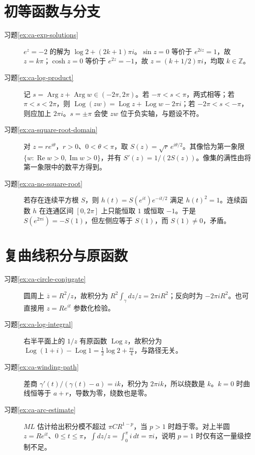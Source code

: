 \documentclass[UTF8,12pt,a4paper,fontset=fandol]{ctexbook}
\begin{document}
\section{初等函数与分支}
\begin{description}
 \item[习题\ref{ex:ca-exp-solutions}]
 $e^z=-2$ 的解为 $\log2+(2k+1)\pi i$。$\sin z=0$ 等价于 $e^{2iz}=1$，故 $z=k\pi$；$\cosh z=0$ 等价于 $e^{2z}=-1$，故 $z=(k+1/2)\pi i$，均取 $k\in\mathbb{Z}$。
 \item[习题\ref{ex:ca-log-product}]
 记 $s=\operatorname{Arg}z+\operatorname{Arg}w\in(-2\pi,2\pi)$。若 $-\pi<s<\pi$，两式相等；若 $\pi<s<2\pi$，则 $\operatorname{Log}(zw)=\operatorname{Log}z+\operatorname{Log}w-2\pi i$；若 $-2\pi<s<-\pi$，则应加上 $2\pi i$。$s=\pm\pi$ 会使 $zw$ 位于负实轴，与题设不符。
 \item[习题\ref{ex:ca-square-root-domain}]
 对 $z=re^{i\theta}$，$r>0$、$0<\theta<\pi$，取 $S(z)=\sqrt r\,e^{i\theta/2}$。其像恰为第一象限 $\{w:\operatorname{Re}w>0,\operatorname{Im}w>0\}$，并有 $S'(z)=1/(2S(z))$。像集的满性由将第一象限中的数平方得到。
 \item[习题\ref{ex:ca-no-square-root}]
 若存在连续平方根 $S$，则 $h(t)=S(e^{it})e^{-it/2}$ 满足 $h(t)^2=1$。连续函数 $h$ 在连通区间 $[0,2\pi]$ 上只能恒取 $1$ 或恒取 $-1$。于是 $S(e^{2\pi i})=-S(1)$，但左侧应等于 $S(1)$，而 $S(1)\ne0$，矛盾。
\end{description}

\section{复曲线积分与原函数}
\begin{description}
 \item[习题\ref{ex:ca-circle-conjugate}]
 圆周上 $\overline z=R^2/z$，故积分为 $R^2\int_\gamma dz/z=2\pi iR^2$；反向时为 $-2\pi iR^2$。也可直接用 $z=Re^{it}$ 参数化检验。
 \item[习题\ref{ex:ca-log-integral}]
 右半平面上的 $1/z$ 有原函数 $\operatorname{Log}z$，故积分为 $\operatorname{Log}(1+i)-\operatorname{Log}1=\tfrac12\log2+\tfrac{\pi i}{4}$，与路径无关。
 \item[习题\ref{ex:ca-winding-path}]
 差商 $\gamma'(t)/(\gamma(t)-a)=ik$，积分为 $2\pi ik$，所以绕数是 $k$。$k=0$ 时曲线恒等于 $a+r$，导数为零，绕数也是零。
 \item[习题\ref{ex:ca-arc-estimate}]
 $ML$ 估计给出积分模不超过 $\pi C R^{1-p}$，当 $p>1$ 时趋于零。对上半圆 $z=Re^{it}$、$0\le t\le\pi$，$\int dz/z=\int_0^\pi i\,dt=\pi i$，说明 $p=1$ 时仅有这一量级控制不足。
\end{description}
\end{document}
